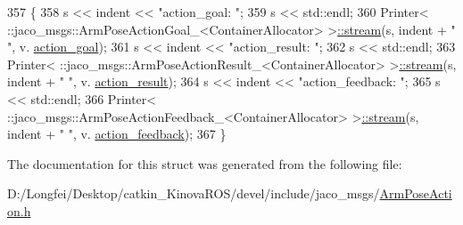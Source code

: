 \begin{DoxyCode}
357   \{
358     s << indent << \textcolor{stringliteral}{"action\_goal: "};
359     s << std::endl;
360     Printer< ::jaco\_msgs::ArmPoseActionGoal\_<ContainerAllocator> >\hyperlink{structros_1_1message__operations_1_1Printer_3_01_1_1jaco__msgs_1_1ArmPoseAction___3_01ContainerAllocator_01_4_01_4_af0ae74e335e0db9e3994c0a048ea1a0c}{::stream}(s, indent + \textcolor{stringliteral}{"  "}, v.
      \hyperlink{structjaco__msgs_1_1ArmPoseAction___a6347014c556c9d16ce23aeda73381e66}{action\_goal});
361     s << indent << \textcolor{stringliteral}{"action\_result: "};
362     s << std::endl;
363     Printer< ::jaco\_msgs::ArmPoseActionResult\_<ContainerAllocator> >\hyperlink{structros_1_1message__operations_1_1Printer_3_01_1_1jaco__msgs_1_1ArmPoseAction___3_01ContainerAllocator_01_4_01_4_af0ae74e335e0db9e3994c0a048ea1a0c}{::stream}(s, indent + \textcolor{stringliteral}{"  "}, v.
      \hyperlink{structjaco__msgs_1_1ArmPoseAction___a7ba6a9ad3ef5f285de5d80638173ccda}{action\_result});
364     s << indent << \textcolor{stringliteral}{"action\_feedback: "};
365     s << std::endl;
366     Printer< ::jaco\_msgs::ArmPoseActionFeedback\_<ContainerAllocator> >\hyperlink{structros_1_1message__operations_1_1Printer_3_01_1_1jaco__msgs_1_1ArmPoseAction___3_01ContainerAllocator_01_4_01_4_af0ae74e335e0db9e3994c0a048ea1a0c}{::stream}(s, indent + \textcolor{stringliteral}{"  "}, v.
      \hyperlink{structjaco__msgs_1_1ArmPoseAction___a695dce59093487f6fc2cf2e6f56054b1}{action\_feedback});
367   \}
\end{DoxyCode}


The documentation for this struct was generated from the following file\+:\begin{DoxyCompactItemize}
\item 
D\+:/\+Longfei/\+Desktop/catkin\+\_\+\+Kinova\+R\+O\+S/devel/include/jaco\+\_\+msgs/\hyperlink{ArmPoseAction_8h}{Arm\+Pose\+Action.\+h}\end{DoxyCompactItemize}
